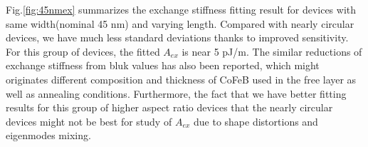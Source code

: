Fig.\ref{fig:45nmex} summarizes the exchange stiffness fitting result for devices with same width(nominal 45 nm) and varying length. Compared with nearly circular devices, we have much less standard deviations thanks to improved sensitivity. For this group of devices, the fitted $A_{ex}$ is near 5  pJ/m. The similar reductions of exchange stiffness from bluk values has also been reported\cite{AexJapan}, which might originates different composition and thickness of CoFeB used in the free layer as well as annealing conditions\cite{DomainCoFeB}. Furthermore, the fact that we have better fitting results for this group of higher aspect ratio devices that the nearly circular devices might not be best for study of $A_{ex}$ due to shape distortions and eigenmodes mixing.
